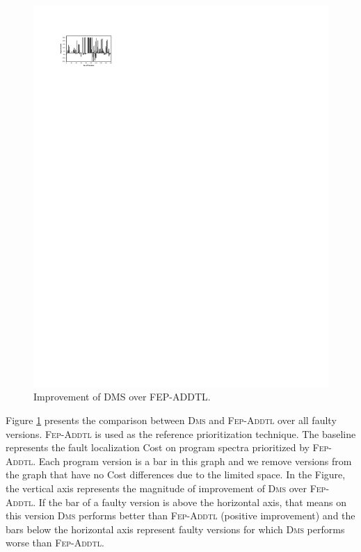 \begin{figure}[!htbp]
    \centering
    \includegraphics[width=12cm]{our_vs_fep.pdf}
    \caption{Improvement of D{\scriptsize MS} over F{\scriptsize EP}-A{\scriptsize DDTL}.}
    \label{fig:our_vs_fep}
\end{figure}

Figure \ref{fig:our_vs_fep} presents the comparison
between \textsc{Dms} and \textsc{Fep-Addtl} over all faulty versions.
\textsc{Fep-Addtl} is used as the reference prioritization technique.
The baseline represents the fault localization Cost on program spectra prioritized
by \textsc{Fep-Addtl}. Each program version is a bar in this graph and we remove
versions from the graph that have no Cost differences due to the limited space.
In the Figure, the vertical axis represents the magnitude of
improvement of \textsc{Dms} over \textsc{Fep-Addtl}.
If the bar of a faulty version is above the
horizontal axis, that means on this version \textsc{Dms} performs
better than \textsc{Fep-Addtl} (positive improvement) and the bars
below the horizontal axis represent faulty versions for which
\textsc{Dms} performs worse than \textsc{Fep-Addtl}.

